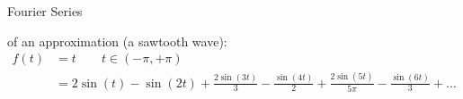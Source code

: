 \begin{frame}[t]{Fourier Series}

    \myExample of an approximation (a sawtooth wave):
    {\scriptsize
    \begin{align*}
        f(t) & = t \quad\quad t \in \left(-\pi,+\pi\right)                                                                                                                                                                           \\
             & = 2 \sin{\left(t \right)} - \sin{\left(2 t \right)} + \frac{2 \sin{\left(3 t \right)}}{3} - \frac{\sin{\left(4 t \right)}}{2} + \frac{2 \sin{\left(5 t \right)}}{5 \pi} - \frac{\sin{\left(6 t \right)}}{3} +  \ldots
    \end{align*}}%
    \begin{center}
\end{center}
\end{frame}

